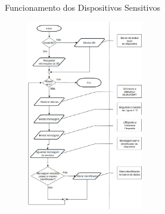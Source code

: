 \documentclass{beamer}
\begin{document}
    \begin{frame}{Funcionamento dos Dispositivos Sensitivos}
      \begin{center}
      \includegraphics[height=235pt, width=200pt]{fluxogramaSensor}
      \end{center}
    \end{frame}
\end{document}
